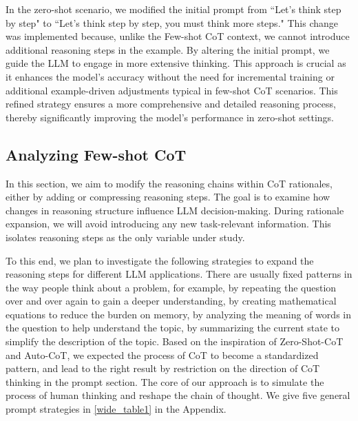 \documentclass[11pt]{article}
\begin{document}
In the zero-shot scenario, we modified the initial prompt from ``Let's think step by step" to ``Let's think step by step, you must think more steps." This change was implemented because, unlike the Few-shot CoT context, we cannot introduce additional reasoning steps in the example. By altering the initial prompt, we guide the LLM to engage in more extensive thinking. This approach is crucial as it enhances the model's accuracy without the need for incremental training or additional example-driven adjustments typical in few-shot CoT scenarios. This refined strategy ensures a more comprehensive and detailed reasoning process, thereby significantly improving the model's performance in zero-shot settings.

\subsection{Analyzing Few-shot CoT}
In this section, we aim to modify the reasoning chains within CoT rationales, either by adding or compressing reasoning steps. The goal is to examine how changes in reasoning structure influence LLM decision-making. During rationale expansion, we will avoid introducing any new task-relevant information. This isolates reasoning steps as the only variable under study.

To this end, we plan to investigate the following strategies to expand the reasoning steps for different LLM applications.
There are usually fixed patterns in the way people think about a problem, for example, by repeating the question over and over again to gain a deeper understanding, by creating mathematical equations to reduce the burden on memory, by analyzing the meaning of words in the question to help understand the topic, by summarizing the current state to simplify the description of the topic.
Based on the inspiration of Zero-Shot-CoT and Auto-CoT, we expected the process of CoT to become a standardized pattern, and lead to the right result by restriction on the direction of CoT thinking in the prompt section.
The core of our approach is to simulate the process of human thinking and reshape the chain of thought. We give five general prompt strategies in \autoref{wide_table1} in the Appendix.
\end{document}
